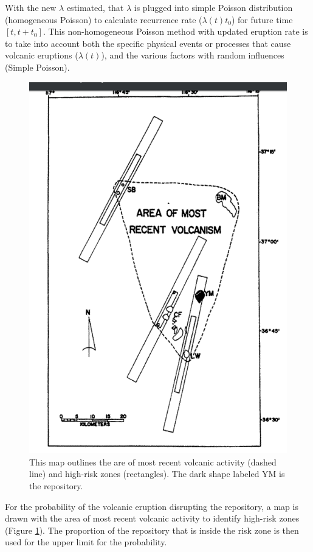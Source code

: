 \documentclass[12pt]{article}
\begin{document}
With the new $\lambda$ estimated, that $\lambda$ is plugged into simple Poisson distribution
(homogeneous Poisson) to calculate recurrence rate ($\lambda(t) t_0 $) for future time $[t, t+t_0]$.
This non-homogeneous Poisson method with updated eruption rate is to take into account both the 
specific physical events or processes that cause volcanic eruptions ($\lambda(t)$), and the 
various factors with random influences (Simple Poisson).

\begin{figure}[h]
\centering
\includegraphics[scale=0.3]{./images/map.png}
\caption{This map outlines the are of most recent volcanic activity (dashed line)
and high-risk zones (rectangles). The dark shape labeled YM is the repository.}
\label{fig:map}
\end{figure}


For the probability of the volcanic eruption disrupting the repository, a map is drawn
with the area of most recent volcanic activity to identify high-risk zones (Figure \ref{fig:map}).
The proportion of the repository that is inside the risk zone is then used
for the upper limit for the probability.
\end{document}
